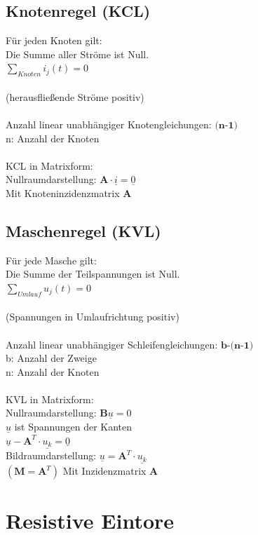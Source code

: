 \documentclass[a4paper,twocolumn,10pt]{article}
\begin{document}
\subsection*{Knotenregel (KCL)}
Für jeden Knoten gilt:\\
Die Summe aller Ströme ist Null.\\
$\sum\limits_{Knoten}^{} i_j(t)=0$\\\\
(herausfließende Ströme positiv)\\\\
Anzahl linear unabhängiger Knotengleichungen: $\textbf{(n-1)}$\\
n: Anzahl der Knoten\\\\
KCL in Matrixform:\\
Nullraumdarstellung: $\textbf{A}\cdot \underline{i}=\underline{0}$\\
Mit Knoteninzidenzmatrix \textbf{A}

\subsection*{Maschenregel (KVL)}
Für jede Masche gilt:\\
Die Summe der Teilspannungen ist Null.\\
$\sum\limits_{Umlauf}^{} u_j(t)=0$\\\\
(Spannungen in Umlaufrichtung positiv)\\\\
Anzahl linear unabhängiger Schleifengleichungen: $\textbf{b-(n-1)}$\\
b: Anzahl der Zweige\\
n: Anzahl der Knoten\\\\
KVL in Matrixform:\\
Nullraumdarstellung: $\textbf{B}\underline{u}=0$\\
$\underline{u}$ ist Spannungen der Kanten\\$\underline{u}-\textbf{A}^T\cdot \underline{u_k}=\underline{0}$\\
Bildraumdarstellung: $\underline{u}=\textbf{A}^T\cdot\underline{u_k}$\\
$(\textbf{M}=\textbf{A}^T)$ Mit Inzidenzmatrix $\textbf{A}$

\section*{Resistive Eintore}
\end{document}
